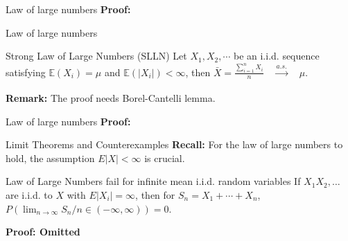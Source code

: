 \documentclass [aspectratio=169]{beamer}
\begin{document}
\begin{frame}{Law of large numbers}
\textbf{Proof:}\\
\vspace{1.5in}
\end{frame}


\begin{frame}{Law of large numbers}
    \begin{block}{Strong Law of Large Numbers (SLLN)}
    Let $X_1, X_2, \cdots$ be an i.i.d. sequence satisfying $\mathbb{E}(X_i) = \mu$ and $\mathbb{E}(|X_i|) < \infty$, then 
    $\bar{X} = \frac{\sum_{i = 1}^n X_i}{n} \quad \xrightarrow[]{a.s.} \quad \mu $.
    \end{block}
    \vspace{0.1in}
    \textbf{Remark:} The proof needs Borel-Cantelli lemma.
    \vspace{0.1in}
\end{frame}

\begin{frame}{Law of large numbers}
    \textbf{Proof:}\\
    \vspace{2.5in}
\end{frame}

\begin{frame}{Limit Theorems and Counterexamples}
    \textbf{Recall:} For the law of large numbers to hold, the assumption $E|X|<\infty$ is crucial. \\ 
    \begin{block}{Law of Large Numbers fail for infinite mean i.i.d. random variables}
    If $X_1 X_2, \dots$ are i.i.d. to $X$ with $E|X_i| = \infty$, then for $S_n = X_1 + \cdots + X_n$, $P(\lim_{n\to \infty}S_n/n \in (-\infty, \infty))=0$.
    \end{block}
    \textbf{Proof: Omitted}
    \vspace{1.8in}
\end{frame}
\end{document}
